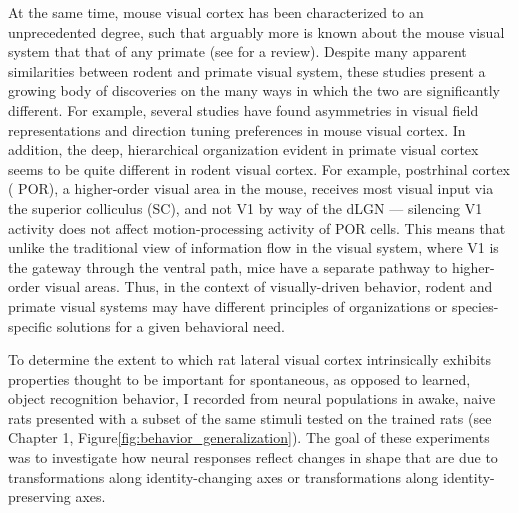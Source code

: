 At the same time, mouse visual cortex has been characterized to an unprecedented degree, such that arguably more is known about the mouse visual system that that of any primate (see \citet{Niell2021} for a review). Despite many apparent similarities between rodent and primate visual system, these studies present a growing body of discoveries on the many ways in which the two are significantly different. For example, several studies have found asymmetries in visual field representations and direction tuning preferences in mouse visual cortex\cite{Zhuang2017, Liang2018, Sit2020, Murgas2020}. In addition, the deep, hierarchical organization evident in primate visual cortex seems to be quite different in rodent visual cortex. For example, postrhinal cortex ( POR), a higher-order visual area in the mouse, receives most visual input via the superior colliculus (SC), and not V1 by way of the dLGN --- silencing V1 activity does not affect motion-processing activity of POR cells\cite{Beltramo2019}. This means that unlike the traditional view of information flow in the visual system, where V1 is the gateway through the ventral path, mice have a separate pathway to higher-order visual areas. Thus, in the context of visually-driven behavior, rodent and primate visual systems may have different principles of organizations or species-specific solutions for a given behavioral need. 

To determine the extent to which rat lateral visual cortex intrinsically exhibits properties thought to be important for spontaneous, as opposed to learned, object recognition behavior, I recorded from neural populations in awake, naive rats presented with a subset of the same stimuli tested on the trained rats (see Chapter 1, Figure\ref{fig:behavior_generalization}). The goal of these experiments was to investigate how neural responses reflect changes in shape that are due to transformations along identity-changing axes or transformations along identity-preserving axes.

